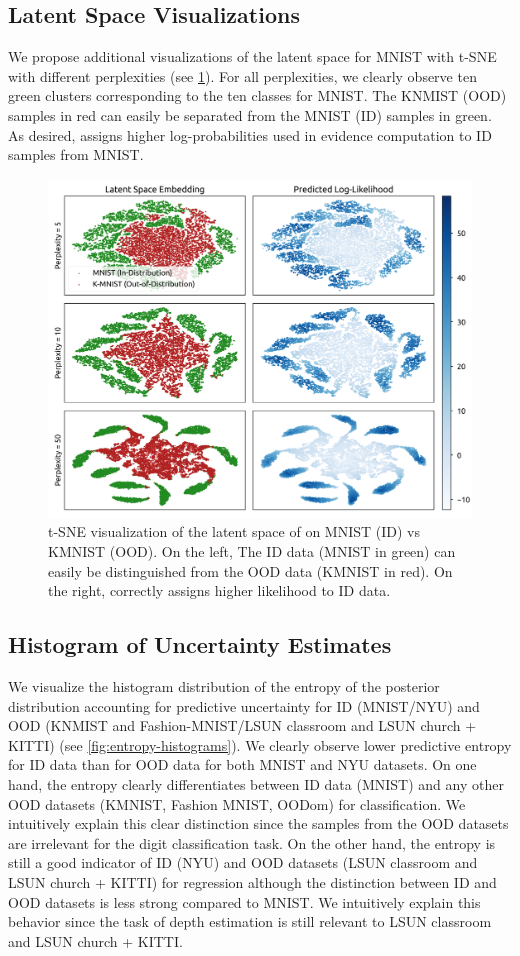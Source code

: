 \subsection{Latent Space Visualizations}

We propose additional visualizations of the latent space for MNIST with t-SNE \citep{tsne} with different perplexities (see \cref{fig:latent-space}). For all perplexities, we clearly observe ten green clusters corresponding to the ten classes for MNIST. The KNMIST (OOD) samples in red can easily be separated from the MNIST (ID) samples in green. As desired, \NatPNacro{} assigns higher log-probabilities used in evidence computation to ID samples from MNIST.

\begin{figure}[ht!]
    \centering
    \includegraphics[width=0.6 \textwidth]{sections/007_iclr2022/resources/appendix/embedding-new.png}
    \caption{t-SNE visualization of the latent space of \NatPNacro{} on MNIST (ID) vs KMNIST (OOD). On the left, The ID data (MNIST in green) can easily be distinguished from the OOD data (KMNIST in red). On the right, \NatPNacro{} correctly assigns higher likelihood to ID data.}
    \label{fig:latent-space}
\end{figure}

\subsection{Histogram of Uncertainty Estimates}

We visualize the histogram distribution of the entropy of the posterior distribution accounting for predictive uncertainty for ID (MNIST/NYU) and OOD (KNMIST and Fashion-MNIST/LSUN classroom and LSUN church + KITTI) (see \cref{fig:entropy-histograms}). We clearly observe lower predictive entropy for ID data than for OOD data for both MNIST and NYU datasets. On one hand, the entropy clearly differentiates between ID data (MNIST) and any other OOD datasets (KMNIST, Fashion MNIST, OODom) for classification. We intuitively explain this clear distinction since the samples from the OOD datasets are irrelevant for the digit classification task. On the other hand, the entropy is still a good indicator of ID (NYU) and OOD datasets (LSUN classroom and LSUN church + KITTI) for regression although the distinction between ID and OOD datasets is less strong compared to MNIST. We intuitively explain this behavior since the task of depth estimation is still relevant to LSUN classroom and LSUN church + KITTI.

